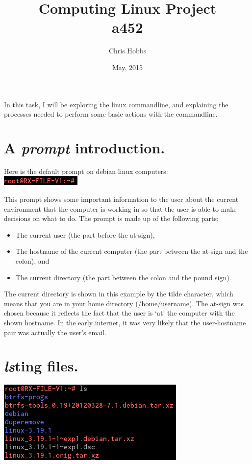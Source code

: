 \documentclass[11pt,twoside,a4paper]{article}
\begin{document}
	\title{Computing Linux Project\\
	a452}
	\author{Chris Hobbs}
	\date{May, 2015}
	\maketitle

	In this task, I will be exploring the linux commandline, and explaining the processes needed to perform some basic actions with the commandline.

	\section{A \emph{prompt} introduction.}

		Here is the default prompt on debian linux computers:\\
		\includegraphics{prompt}

		This prompt shows some important information to the user about the current environment that the computer is working in so that the user is able to make decisions on what to do. The prompt is made up of the following parts:

		\begin{itemize}
		    \item The current user (the part before the at-sign),
		    \item The hostname of the current computer (the part between the at-sign and the colon), and
		    \item The current directory (the part between the colon and the pound sign).
		\end{itemize}

		The current directory is shown in this example by the tilde character, which means that you are in your home directory (/home/username). The at-sign was chosen because it reflects the fact that the user is `at' the computer with the shown hostname. In the early internet, it was very likely that the user-hostname pair was actually the user's email.

	\section{\emph{ls}ting files.}

		\includegraphics{ls}
\end{document}
